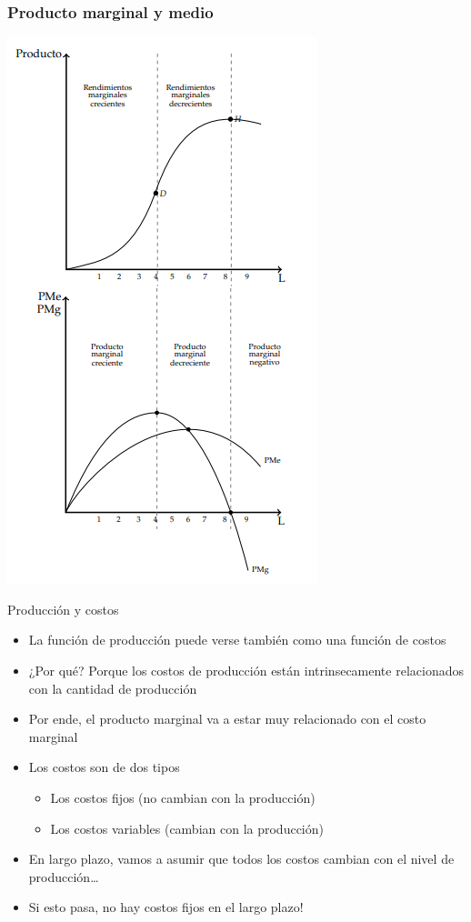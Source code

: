 \documentclass{beamer}
\begin{document}
\begin{frame}
    \frametitle{Producto marginal y medio}
    \centering
    \includegraphics[scale=0.65]{../Figures/C12.7.png}
\end{frame}

\begin{frame}{Producción y costos}
\begin{itemize}
    \item La función de producción puede verse también como una función de costos
    \item ¿Por qué? Porque los costos de producción están intrinsecamente relacionados con la cantidad de producción
    \item Por ende, el producto marginal va a estar muy relacionado con el costo marginal
    \item Los costos son de dos tipos
    \begin{itemize} 
        \item Los costos fijos (no cambian con la producción)
        \item Los costos variables (cambian con la producción)
    \end{itemize}
    \item En largo plazo, vamos a asumir que todos los costos cambian con el nivel de producción\dots
    \item Si esto pasa, no hay costos fijos en el largo plazo!
\end{itemize}
\end{frame}
\end{document}

